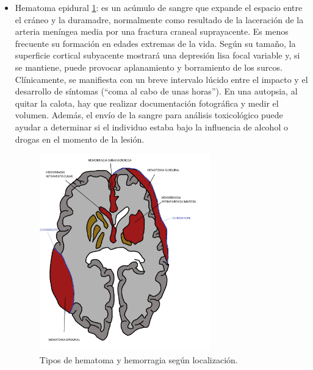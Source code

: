 \begin{itemize}
	\item Hematoma epidural \ref{fig:figura3}: es un acúmulo de sangre que expande el espacio entre el cráneo y la duramadre, normalmente como resultado de la laceración de la arteria meníngea media por una fractura craneal suprayacente. Es menos frecuente su formación en edades extremas de la vida. Según su tamaño, la superficie cortical subyacente mostrará una depresión lisa focal variable y, si se mantiene, puede provocar aplanamiento y borramiento de los surcos. Clínicamente, se manifiesta con un breve intervalo lúcido entre el impacto y el desarrollo de síntomas (“coma al cabo de unas horas”). En una autopsia, al quitar la calota, hay que realizar documentación fotográfica y medir el volumen. Además, el envío de la sangre para análisis toxicológico puede ayudar a determinar si el individuo estaba bajo la influencia de alcohol o drogas en el momento de la lesión.
	
	\begin{figure}
		\centering
		\includegraphics[width=0.7\textwidth]{imagenes/Figura3}
		\caption{Tipos de hematoma y hemorragia según localización.}
		\label{fig:figura3}
	\end{figure} 


\end{itemize}
